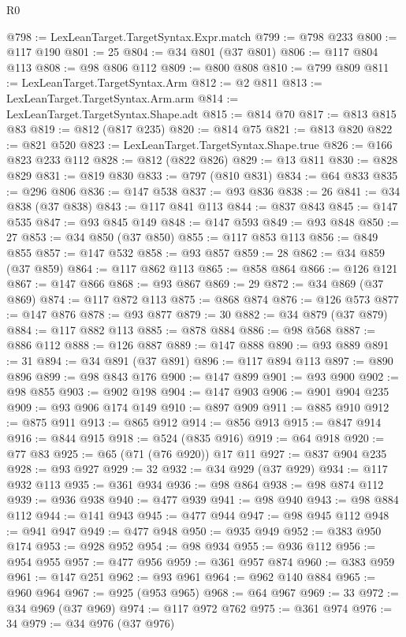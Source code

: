 \begin{lexlean}{R0}
\begin{coremodule}
@798 := LexLeanTarget.TargetSyntax.Expr.match
@799 := @798 @233
@800 := @117 @190
@801 := 25
@804 := @34 @801 (@37 @801)
@806 := @117 @804 @113
@808 := @98 @806 @112
@809 := @800 @808
@810 := @799 @809
@811 := LexLeanTarget.TargetSyntax.Arm
@812 := @2 @811
@813 := LexLeanTarget.TargetSyntax.Arm.arm
@814 := LexLeanTarget.TargetSyntax.Shape.adt
@815 := @814 @70
@817 := @813 @815 @83
@819 := @812 (@817 @235)
@820 := @814 @75
@821 := @813 @820
@822 := @821 @520
@823 := LexLeanTarget.TargetSyntax.Shape.true
@826 := @166 @823 @233 @112
@828 := @812 (@822 @826)
@829 := @13 @811
@830 := @828 @829
@831 := @819 @830
@833 := @797 (@810 @831)
@834 := @64 @833
@835 := @296 @806
@836 := @147 @538
@837 := @93 @836
@838 := 26
@841 := @34 @838 (@37 @838)
@843 := @117 @841 @113
@844 := @837 @843
@845 := @147 @535
@847 := @93 @845 @149
@848 := @147 @593
@849 := @93 @848
@850 := 27
@853 := @34 @850 (@37 @850)
@855 := @117 @853 @113
@856 := @849 @855
@857 := @147 @532
@858 := @93 @857
@859 := 28
@862 := @34 @859 (@37 @859)
@864 := @117 @862 @113
@865 := @858 @864
@866 := @126 @121
@867 := @147 @866
@868 := @93 @867
@869 := 29
@872 := @34 @869 (@37 @869)
@874 := @117 @872 @113
@875 := @868 @874
@876 := @126 @573
@877 := @147 @876
@878 := @93 @877
@879 := 30
@882 := @34 @879 (@37 @879)
@884 := @117 @882 @113
@885 := @878 @884
@886 := @98 @568
@887 := @886 @112
@888 := @126 @887
@889 := @147 @888
@890 := @93 @889
@891 := 31
@894 := @34 @891 (@37 @891)
@896 := @117 @894 @113
@897 := @890 @896
@899 := @98 @843 @176
@900 := @147 @899
@901 := @93 @900
@902 := @98 @855
@903 := @902 @198
@904 := @147 @903
@906 := @901 @904 @235
@909 := @93 @906 @174 @149
@910 := @897 @909
@911 := @885 @910
@912 := @875 @911
@913 := @865 @912
@914 := @856 @913
@915 := @847 @914
@916 := @844 @915
@918 := @524 (@835 @916)
@919 := @64 @918
@920 := @77 @83
@925 := @65 (@71 (@76 @920)) @17 @11
@927 := @837 @904 @235
@928 := @93 @927
@929 := 32
@932 := @34 @929 (@37 @929)
@934 := @117 @932 @113
@935 := @361 @934
@936 := @98 @864
@938 := @98 @874 @112
@939 := @936 @938
@940 := @477 @939
@941 := @98 @940
@943 := @98 @884 @112
@944 := @141 @943
@945 := @477 @944
@947 := @98 @945 @112
@948 := @941 @947
@949 := @477 @948
@950 := @935 @949
@952 := @383 @950 @174
@953 := @928 @952
@954 := @98 @934
@955 := @936 @112
@956 := @954 @955
@957 := @477 @956
@959 := @361 @957 @874
@960 := @383 @959
@961 := @147 @251
@962 := @93 @961
@964 := @962 @140 @884
@965 := @960 @964
@967 := @925 (@953 @965)
@968 := @64 @967
@969 := 33
@972 := @34 @969 (@37 @969)
@974 := @117 @972 @762
@975 := @361 @974
@976 := 34
@979 := @34 @976 (@37 @976)

\end{coremodule}
\end{lexlean}
